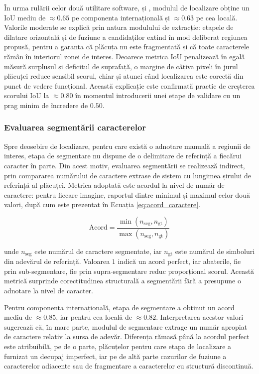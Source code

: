 În urma rulării celor două utilitare software,  și , modulul de localizare obține un IoU mediu de $\approx0.65$ pe componenta internațională și $\approx0.63$ pe cea locală. Valorile moderate se explică prin natura modulului de extracție: etapele de dilatare orizontală și de fuziune a candidaților extind în mod deliberat regiunea propusă, pentru a garanta că plăcuța nu este fragmentată și că toate caracterele rămân în interiorul zonei de interes. Deoarece metrica IoU penalizează în egală măsură surplusul și deficitul de suprafață, o margine de câțiva pixeli în jurul plăcuței reduce sensibil scorul, chiar și atunci când localizarea este corectă din punct de vedere funcțional. Această explicație este confirmată practic de creșterea scorului IoU la $\approx0.80$ în momentul introducerii unei etape de validare cu un prag minim de încredere de $0.50$.

\subsubsection{Evaluarea segmentării caracterelor}
\indent\par
Spre deosebire de localizare, pentru care există o adnotare manuală a regiunii de interes, etapa de segmentare nu dispune de o delimitare de referință a fiecărui caracter în parte. Din acest motiv, evaluarea segmentării se realizează indirect, prin compararea numărului de caractere extrase de sistem cu lungimea șirului de referință al plăcuței. Metrica adoptată este acordul la nivel de număr de caractere: pentru fiecare imagine, raportul dintre minimul și maximul celor două valori, după cum este prezentat în Ecuația \ref{eq:acord_caractere}.

\begin{equation}
    \text{Acord} = \frac{\min(n_{\text{seg}}, n_{\text{gt}})}{\max(n_{\text{seg}}, n_{\text{gt}})}
    \label{eq:acord_caractere}
\end{equation}

\noindent unde $n_{\text{seg}}$ este numărul de caractere segmentate, iar $n_{\text{gt}}$ este numărul de simboluri din adevărul de referință. Valoarea $1$ indică un acord perfect, iar abaterile, fie prin sub-segmentare, fie prin supra-segmentare reduc proporțional scorul. Această metrică surprinde corectitudinea structurală a segmentării fără a presupune o adnotare la nivel de caracter.

Pentru componenta internațională, etapa de segmentare a obținut un acord mediu de $\approx0.85$, iar pentru cea locală de $\approx0.82$. Interpretarea acestor valori sugerează că, în mare parte, modulul de segmentare extrage un număr apropiat de caractere relativ la sursa de adevăr. Diferența rămasă până la acordul perfect este atribuibilă, pe de o parte, plăcuțelor pentru care etapa de localizare a furnizat un decupaj imperfect, iar pe de altă parte cazurilor de fuziune a caracterelor adiacente sau de fragmentare a caracterelor cu structură discontinuă.

